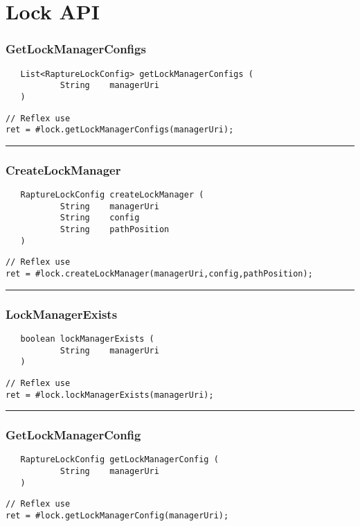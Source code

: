 \section{Lock API}

\subsubsection{GetLockManagerConfigs}
\label{Api:GetLockManagerConfigs}
\begin{verbatim}
   List<RaptureLockConfig> getLockManagerConfigs (
           String    managerUri
   )
\end{verbatim}
\begin{lstlisting}[language=reflex]
// Reflex use
ret = #lock.getLockManagerConfigs(managerUri);
\end{lstlisting}



\rule{15cm}{2pt}
\subsubsection{CreateLockManager}
\label{Api:CreateLockManager}
\begin{verbatim}
   RaptureLockConfig createLockManager (
           String    managerUri
           String    config
           String    pathPosition
   )
\end{verbatim}
\begin{lstlisting}[language=reflex]
// Reflex use
ret = #lock.createLockManager(managerUri,config,pathPosition);
\end{lstlisting}



\rule{15cm}{2pt}
\subsubsection{LockManagerExists}
\label{Api:LockManagerExists}
\begin{verbatim}
   boolean lockManagerExists (
           String    managerUri
   )
\end{verbatim}
\begin{lstlisting}[language=reflex]
// Reflex use
ret = #lock.lockManagerExists(managerUri);
\end{lstlisting}



\rule{15cm}{2pt}
\subsubsection{GetLockManagerConfig}
\label{Api:GetLockManagerConfig}
\begin{verbatim}
   RaptureLockConfig getLockManagerConfig (
           String    managerUri
   )
\end{verbatim}
\begin{lstlisting}[language=reflex]
// Reflex use
ret = #lock.getLockManagerConfig(managerUri);
\end{lstlisting}



